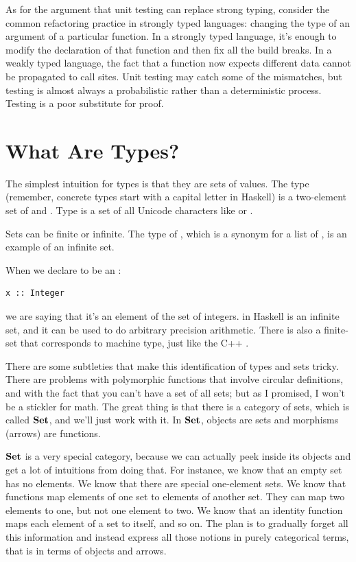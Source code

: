 As for the argument that unit testing can replace strong typing,
consider the common refactoring practice in strongly typed languages:
changing the type of an argument of a particular function. In a strongly
typed language, it's enough to modify the declaration of that function
and then fix all the build breaks. In a weakly typed language, the fact
that a function now expects different data cannot be propagated to call
sites. Unit testing may catch some of the mismatches, but testing is
almost always a probabilistic rather than a deterministic process.
Testing is a poor substitute for proof.

\section{What Are Types?}

The simplest intuition for types is that they are sets of values. The
type  (remember, concrete types start with a capital letter
in Haskell) is a two-element set of  and .
Type  is a set of all Unicode characters like
 or .

Sets can be finite or infinite. The type of , which is a
synonym for a list of , is an example of an infinite set.

When we declare  to be an :

\begin{Verbatim}
x :: Integer
\end{Verbatim}
we are saying that it's an element of the set of integers.
 in Haskell is an infinite set, and it can be used to do
arbitrary precision arithmetic. There is also a finite-set 
that corresponds to machine type, just like the C++ .

There are some subtleties that make this identification of types and
sets tricky. There are problems with polymorphic functions that involve
circular definitions, and with the fact that you can't have a set of all
sets; but as I promised, I won't be a stickler for math. The great thing
is that there is a category of sets, which is called $\mathbf{Set}$, and
we'll just work with it. In $\mathbf{Set}$, objects are sets and morphisms
(arrows) are functions.

$\mathbf{Set}$ is a very special category, because we can actually peek
inside its objects and get a lot of intuitions from doing that. For
instance, we know that an empty set has no elements. We know that there
are special one-element sets. We know that functions map elements of one
set to elements of another set. They can map two elements to one, but
not one element to two. We know that an identity function maps each
element of a set to itself, and so on. The plan is to gradually forget
all this information and instead express all those notions in purely
categorical terms, that is in terms of objects and arrows.

